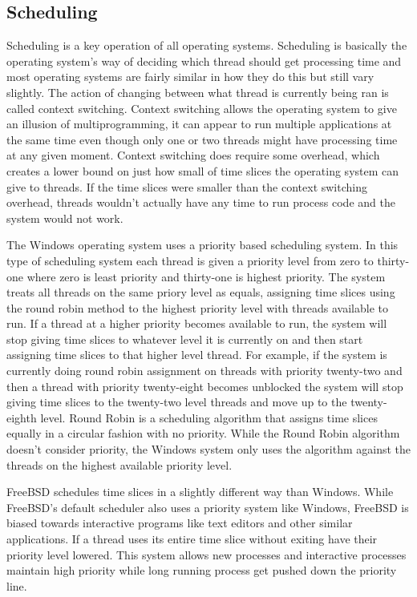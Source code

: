 \documentclass[10pt,serif,draftclsnofoot,onecolumn]{IEEEtran}
\begin{document}
	\subsection{Scheduling}
	\par
	Scheduling is a key operation of all operating systems. Scheduling is basically the operating system's way of deciding which thread should get processing time and most operating systems are fairly similar in how they do this but still vary slightly. The action of changing between what thread is currently being ran is called context switching. Context switching allows the operating system to give an illusion of multiprogramming, it can appear to run multiple applications at the same time even though only one or two threads might have processing time at any given moment\cite{1}. Context switching does require some overhead, which creates a lower bound on just how small of time slices the operating system can give to threads. If the time slices were smaller than the context switching overhead, threads wouldn't actually have any time to run process code and the system would not work.
	\newline
	\par
	The Windows operating system uses a priority based scheduling system. In this type of scheduling system each thread is given a priority level from zero to thirty-one where zero is least priority and thirty-one is highest priority. The system treats all threads on the same priory level as equals, assigning time slices using the round robin method to the highest priority level with threads available to run\cite{5}. If a thread at a higher priority becomes available to run, the system will stop giving time slices to whatever level it is currently on and then start assigning time slices to that higher level thread. For example, if the system is currently doing round robin assignment on threads with priority twenty-two and then a thread with priority twenty-eight becomes unblocked the system will stop giving time slices to the twenty-two level threads and move up to the twenty-eighth level. Round Robin is a scheduling algorithm that assigns time slices equally in a circular fashion with no priority. While the Round Robin algorithm doesn't consider priority, the Windows system only uses the algorithm against the threads on the highest available priority level.
	\newline
	\par
	FreeBSD schedules time slices in a slightly different way than Windows. While FreeBSD's default scheduler also uses a priority system like Windows, FreeBSD is biased towards interactive programs like text editors and other similar applications\cite{1}. If a thread uses its entire time slice without exiting have their priority level lowered. This system allows new processes and interactive processes maintain high priority while long running process get pushed down the priority line.
\end{document}
